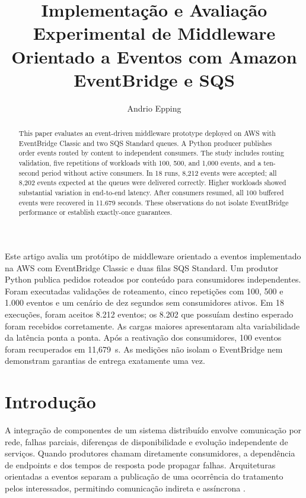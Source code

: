 \documentclass[12pt]{article}
\title{Implementação e Avaliação Experimental de Middleware Orientado a Eventos com Amazon EventBridge e SQS}
\author{Andrio Epping\inst{1}}
\begin{document}
\maketitle

\begin{abstract}
This paper evaluates an event-driven middleware prototype deployed on AWS
with EventBridge Classic and two SQS Standard queues. A Python producer
publishes order events routed by content to independent consumers. The study
includes routing validation, five repetitions of workloads with 100, 500,
and 1,000 events, and a ten-second period without active consumers. In 18
runs, 8,212 events were accepted; all 8,202 events expected at the queues
were delivered correctly. Higher workloads showed substantial variation in
end-to-end latency. After consumers resumed, all 100 buffered events were
recovered in 11.679 seconds. These observations do not isolate EventBridge
performance or establish exactly-once guarantees.
\end{abstract}

\begin{resumo}
Este artigo avalia um protótipo de middleware orientado a eventos implementado
na AWS com EventBridge Classic e duas filas SQS Standard. Um produtor Python
publica pedidos roteados por conteúdo para consumidores independentes.
Foram executadas validações de roteamento, cinco repetições com 100, 500 e
1.000 eventos e um cenário de dez segundos sem consumidores ativos. Em
18 execuções, foram aceitos 8.212 eventos; os 8.202 que possuíam destino
esperado foram recebidos corretamente. As cargas maiores apresentaram alta
variabilidade da latência ponta a ponta. Após a reativação dos consumidores,
100 eventos foram recuperados em 11,679~s. As medições não isolam o
EventBridge nem demonstram garantias de entrega exatamente uma vez.
\end{resumo}

\section{Introdução}
A integração de componentes de um sistema distribuído envolve comunicação
por rede, falhas parciais, diferenças de disponibilidade e evolução
independente de serviços. Quando produtores chamam diretamente consumidores,
a dependência de endpoints e dos tempos de resposta pode propagar falhas.
Arquiteturas orientadas a eventos separam a publicação de uma ocorrência do
tratamento pelos interessados, permitindo comunicação indireta e assíncrona
\cite{tanenbaum2002,hohpe2003}.
\end{document}
